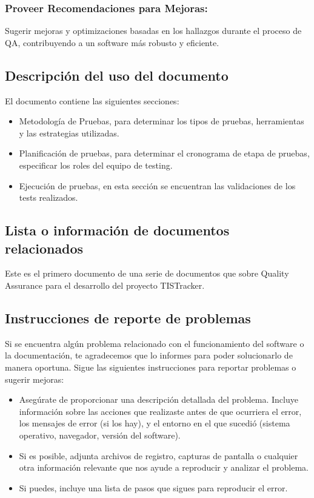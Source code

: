 \documentclass[12pt,letterpaper]{article}
\begin{document}
    \subsubsection{Proveer Recomendaciones para Mejoras:}
    Sugerir mejoras y optimizaciones basadas en los hallazgos durante el proceso de QA, contribuyendo a un software más robusto y eficiente.
    
    
    \subsection{Descripción del uso del documento}

    El documento contiene las siguientes secciones:
    \begin{itemize}
        \item Metodología de Pruebas, para determinar los tipos de pruebas, herramientas y las estrategias utilizadas. 
        \item Planificación de pruebas, para determinar el cronograma de etapa de pruebas, especificar los roles del equipo de testing.
        \item Ejecución de pruebas, en esta sección se encuentran las validaciones de los tests realizados.
    \end{itemize}
    
    \subsection{Lista o información de documentos relacionados}

    Este es el primero documento de una serie de documentos que sobre Quality Assurance para el desarrollo del proyecto TISTracker.
    
    \subsection{Instrucciones de reporte de problemas}

    Si se encuentra algún problema relacionado con el funcionamiento del software o la documentación, te agradecemos que lo informes para poder solucionarlo de manera oportuna. Sigue las siguientes instrucciones para reportar problemas o sugerir mejoras:

    \begin{itemize}
        \item  Asegúrate de proporcionar una descripción detallada del problema. Incluye información sobre las acciones que realizaste antes de que ocurriera el error, los mensajes de error (si los hay), y el entorno en el que sucedió (sistema operativo, navegador, versión del software).
        \item Si es posible, adjunta archivos de registro, capturas de pantalla o cualquier otra información relevante que nos ayude a reproducir y analizar el problema.
        \item Si puedes, incluye una lista de pasos que sigues para reproducir el error.
    \end{itemize}
    
\end{document}
